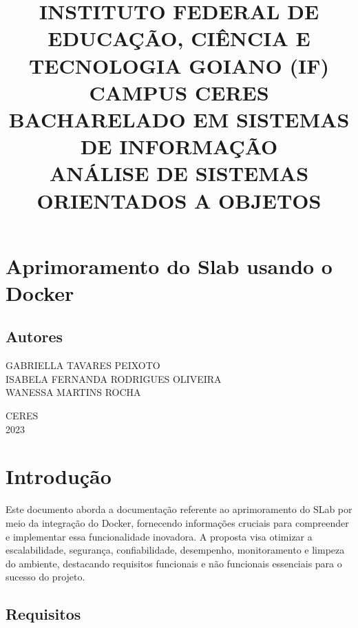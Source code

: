 \documentclass{article}
\begin{document}
\title{INSTITUTO FEDERAL DE EDUCAÇÃO, CIÊNCIA E TECNOLOGIA GOIANO (IF)\\ CAMPUS CERES\\ BACHARELADO EM SISTEMAS DE INFORMAÇÃO\\ANÁLISE DE SISTEMAS ORIENTADOS A OBJETOS}
\doublespacing
\date{}
\maketitle
\vspace{50pt}

\section*{Aprimoramento do Slab usando o Docker}
\vspace{70pt}

\begin{center}
\large
\section*{Autores} 
 GABRIELLA TAVARES PEIXOTO\\
 ISABELA FERNANDA RODRIGUES OLIVEIRA\\
 WANESSA MARTINS ROCHA\\
 \vspace{90pt}
 
{CERES\\2023}
\vspace{70pt}

\tableofcontents
\end{center}
\vspace{500pt}

\section{Introdução}
{Este documento aborda a documentação referente ao aprimoramento do SLab por meio da integração do Docker, fornecendo informações cruciais para compreender e implementar essa funcionalidade inovadora. A proposta visa otimizar a escalabilidade, segurança, confiabilidade, desempenho, monitoramento e limpeza do ambiente, destacando requisitos funcionais e não funcionais essenciais para o sucesso do projeto.}
\vspace{10pt}

\subsection{Requisitos}
\vspace{10pt}
\end{document}

